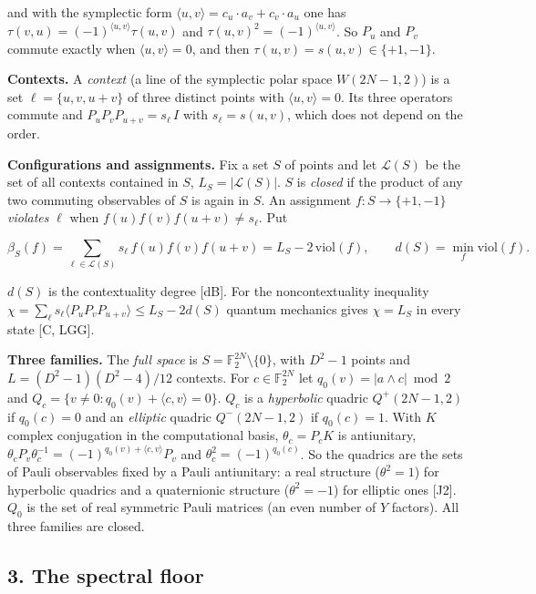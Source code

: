 \documentclass[11pt,a4paper]{article}
\begin{document}
and with the symplectic form \(\langle u, v\rangle = c_u\cdot a_v + c_v \cdot a_u\) one has
\(\tau(v,u) = (-1)^{\langle u,v\rangle}\tau(u,v)\) and \(\tau(u,v)^2 = (-1)^{\langle u,v\rangle}\).
So \(P_u\) and \(P_v\) commute exactly when \(\langle u,v\rangle = 0\), and then \(\tau(u,v) = s(u,v) \in \{+1,-1\}\).

\textbf{Contexts.} A \emph{context} (a line of the symplectic polar space \(W(2N-1,2)\)) is a set
\(\ell = \{u, v, u+v\}\) of three distinct points with \(\langle u, v\rangle = 0\). Its three operators commute and
\(P_u P_v P_{u+v} = s_\ell\, I\) with \(s_\ell = s(u,v)\), which does not depend on the order.

\textbf{Configurations and assignments.} Fix a set \(S\) of points and let \(\mathcal{L}(S)\) be the set of all
contexts contained in \(S\), \(L_S = |\mathcal{L}(S)|\). \(S\) is \emph{closed} if the product of any two commuting
observables of \(S\) is again in \(S\). An assignment \(f : S \to \{+1,-1\}\) \emph{violates}
\(\ell\) when \(f(u) f(v) f(u+v) \neq s_\ell\). Put

\[\beta_S(f) = \sum_{\ell \in \mathcal{L}(S)} s_\ell\, f(u) f(v) f(u+v) = L_S - 2\,\mathrm{viol}(f),
\qquad d(S) = \min_f \mathrm{viol}(f).\]

\(d(S)\) is the contextuality degree {[}dB{]}. For the noncontextuality inequality
\(\chi = \sum_\ell s_\ell \langle P_u P_v P_{u+v}\rangle \le L_S - 2 d(S)\) quantum mechanics gives
\(\chi = L_S\) in every state {[}C, LGG{]}.

\textbf{Three families.} The \emph{full space} is \(S = \mathbb{F}_2^{2N}\setminus\{0\}\), with \(D^2-1\) points
and \(L = (D^2-1)(D^2-4)/12\) contexts. For \(c \in \mathbb{F}_2^{2N}\) let \(q_0(v) = |a\wedge c| \bmod 2\) and
\(Q_c = \{ v \ne 0 : q_0(v) + \langle c, v\rangle = 0\}\). \(Q_c\) is a \emph{hyperbolic} quadric \(Q^+(2N-1,2)\) if
\(q_0(c) = 0\) and an \emph{elliptic} quadric \(Q^-(2N-1,2)\) if \(q_0(c) = 1\). With \(K\) complex conjugation in the
computational basis, \(\theta_c = P_c K\) is antiunitary, \(\theta_c P_v \theta_c^{-1} = (-1)^{q_0(v) + \langle c,v\rangle} P_v\)
and \(\theta_c^2 = (-1)^{q_0(c)}\). So the quadrics are the sets of Pauli observables fixed by a Pauli
antiunitary: a real structure (\(\theta^2 = 1\)) for hyperbolic quadrics and a quaternionic structure
(\(\theta^2 = -1\)) for elliptic ones {[}J2{]}. \(Q_0\) is the set of real symmetric Pauli matrices (an even
number of \(Y\) factors). All three families are closed.

\subsection{3. The spectral floor}\label{3-the-spectral-floor}
\end{document}

